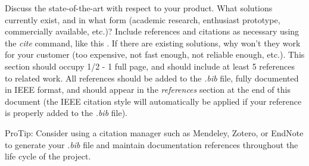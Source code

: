 Discuss the state-of-the-art with respect to your product. What solutions currently exist, and in what form (academic research, enthusiast prototype, commercially available, etc.)? Include references and citations as necessary using the \textit{cite} command, like this \cite{Rubin2012}. If there are existing solutions, why won't they work for your customer (too expensive, not fast enough, not reliable enough, etc.). This section should occupy 1/2 - 1 full page, and should include at least 5 references to related work. All references should be added to the \textit{.bib} file, fully documented in IEEE format, and should appear in the \textit{references} section at the end of this document (the IEEE citation style will automatically be applied if your reference is properly added to the \textit{.bib} file).

ProTip: Consider using a citation manager such as Mendeley, Zotero, or EndNote to generate your \textit{.bib} file and maintain documentation references throughout the life cycle of the project.